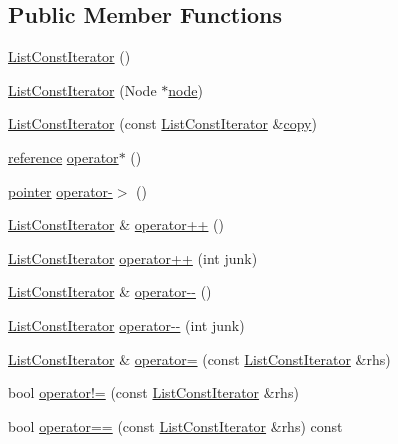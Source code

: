 \subsection*{Public Member Functions}
\begin{DoxyCompactItemize}
\item 
\hyperlink{structprism_1_1_list_const_iterator_a6ddfef491621bcfdba8248c7d5c85016}{List\+Const\+Iterator} ()
\item 
\hyperlink{structprism_1_1_list_const_iterator_ae0f3f8a05448f942444ccef8f20b89c8}{List\+Const\+Iterator} (Node $\ast$\hyperlink{structprism_1_1_list_const_iterator_a373ff5f84e74e50e52ff94162207d68e}{node})
\item 
\hyperlink{structprism_1_1_list_const_iterator_a3776105d19fc71373abe91be535bb9fe}{List\+Const\+Iterator} (const \hyperlink{structprism_1_1_list_const_iterator}{List\+Const\+Iterator} \&\hyperlink{namespaceprism_ae776f4cd825f79e7af1cf6ee1d90a209}{copy})
\item 
\hyperlink{structprism_1_1_list_const_iterator_ad35238dd195319f3f07c12769b52b472}{reference} \hyperlink{structprism_1_1_list_const_iterator_aa21636d257b33f6e83afbae61fae1d58}{operator$\ast$} ()
\item 
\hyperlink{structprism_1_1_list_const_iterator_a1c92e5a7b7d0a92c744027ca421cb651}{pointer} \hyperlink{structprism_1_1_list_const_iterator_abeef58a458ff748c5c63127632e8b5e4}{operator-\/$>$} ()
\item 
\hyperlink{structprism_1_1_list_const_iterator}{List\+Const\+Iterator} \& \hyperlink{structprism_1_1_list_const_iterator_afbfcf2f852a8f297d56ff24aed33dae3}{operator++} ()
\item 
\hyperlink{structprism_1_1_list_const_iterator}{List\+Const\+Iterator} \hyperlink{structprism_1_1_list_const_iterator_a60da75fcfe7e985ac723eec1312db257}{operator++} (int junk)
\item 
\hyperlink{structprism_1_1_list_const_iterator}{List\+Const\+Iterator} \& \hyperlink{structprism_1_1_list_const_iterator_ae1f6d26f39625bad868f2e6a791d0a82}{operator-\/-\/} ()
\item 
\hyperlink{structprism_1_1_list_const_iterator}{List\+Const\+Iterator} \hyperlink{structprism_1_1_list_const_iterator_a986dd5c50149d6737d1464b6faae3946}{operator-\/-\/} (int junk)
\item 
\hyperlink{structprism_1_1_list_const_iterator}{List\+Const\+Iterator} \& \hyperlink{structprism_1_1_list_const_iterator_a30240babbcba4c113fb3731716b83c58}{operator=} (const \hyperlink{structprism_1_1_list_const_iterator}{List\+Const\+Iterator} \&rhs)
\item 
bool \hyperlink{structprism_1_1_list_const_iterator_aa281dd74add7580e06fb32c0db15f8a4}{operator!=} (const \hyperlink{structprism_1_1_list_const_iterator}{List\+Const\+Iterator} \&rhs)
\item 
bool \hyperlink{structprism_1_1_list_const_iterator_adf7ad866935bcde788ea29ed23e9d990}{operator==} (const \hyperlink{structprism_1_1_list_const_iterator}{List\+Const\+Iterator} \&rhs) const 
\end{DoxyCompactItemize}
